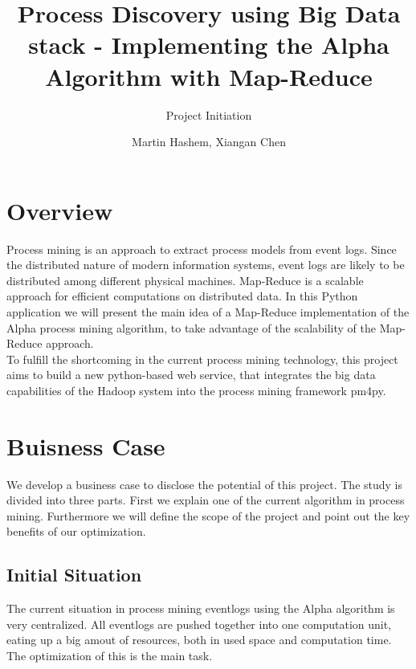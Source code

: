 \documentclass[runningheads]{llncs}
\begin{document}
%
\title{Process Discovery using Big Data stack - Implementing the Alpha Algorithm with Map-Reduce}
\subtitle{Project Initiation}
%
%

\author{Martin Hashem, Xiangan Chen}

%
\maketitle              %
%
%
%
%
\section{Overview}
Process mining is an approach to extract process models from event logs. Since the distributed nature of modern information systems, event logs are likely to be distributed among different physical machines. Map-Reduce is a scalable approach for efficient computations on distributed data. In this Python application we will present the main idea of a Map-Reduce implementation of the Alpha process mining algorithm, to take advantage of the scalability of the Map-Reduce approach.\\

\noindent
To fulfill the shortcoming in the current process mining technology, this project aims to build a new python-based web service, that integrates the big data capabilities of the Hadoop system into the process mining framework pm4py.
\section{Buisness Case}
We develop a business case to disclose the potential of this project. The study is divided into three parts. First we explain one of the current algorithm in process mining. Furthermore we will define the scope of the project and point out the key benefits of our optimization.
\subsection{Initial Situation}
The current situation in process mining eventlogs using the Alpha algorithm is very centralized. All eventlogs are pushed together into one computation unit, eating up a big amout of resources, both in used space and computation time. The optimization of this is the main task.
\end{document}

